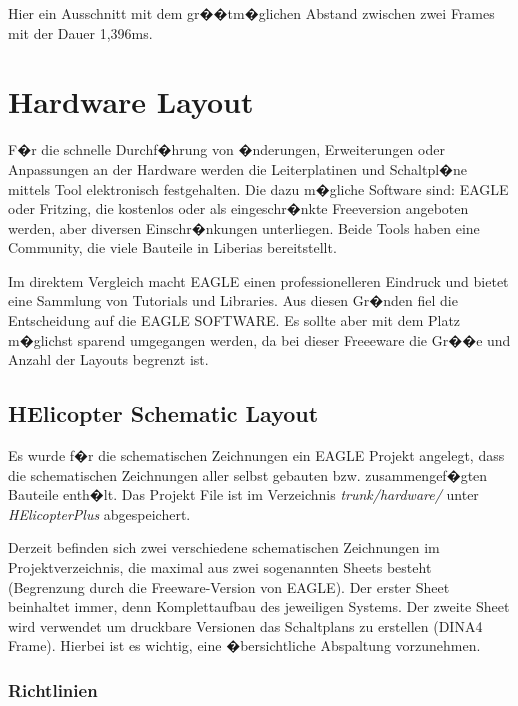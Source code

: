 Hier ein Ausschnitt mit dem gr��tm�glichen Abstand zwischen zwei Frames mit der Dauer 1,396ms.

\section{Hardware Layout}
F�r die schnelle Durchf�hrung von �nderungen, Erweiterungen oder Anpassungen an der Hardware werden die Leiterplatinen und Schaltpl�ne mittels Tool elektronisch festgehalten. Die dazu m�gliche Software sind: EAGLE oder Fritzing,
die kostenlos oder als eingeschr�nkte Freeversion angeboten werden, aber diversen Einschr�nkungen unterliegen. Beide Tools haben eine Community, die viele Bauteile in Liberias bereitstellt. 

Im direktem Vergleich macht EAGLE einen professionelleren Eindruck und bietet eine Sammlung von Tutorials und Libraries. Aus diesen Gr�nden fiel die Entscheidung auf die EAGLE SOFTWARE. Es sollte aber mit dem Platz m�glichst sparend umgegangen werden, da bei dieser Freeeware die Gr��e und Anzahl der Layouts begrenzt ist.

\subsection{HElicopter Schematic Layout}

Es wurde f�r die schematischen Zeichnungen ein EAGLE Projekt angelegt, dass die schematischen Zeichnungen aller selbst gebauten bzw. zusammengef�gten Bauteile enth�lt. Das Projekt File ist im Verzeichnis \textit{trunk/hardware/} unter \textit{HElicopterPlus} abgespeichert.

Derzeit befinden sich zwei verschiedene schematischen Zeichnungen im Projektverzeichnis, die maximal aus zwei sogenannten Sheets besteht (Begrenzung durch die Freeware-Version von EAGLE). Der erster Sheet beinhaltet immer, denn Komplettaufbau des jeweiligen Systems. Der zweite Sheet wird verwendet um druckbare Versionen das Schaltplans zu erstellen (DINA4 Frame). Hierbei ist es wichtig, eine �bersichtliche Abspaltung vorzunehmen. 


\newpage



\subsubsection{Richtlinien\cite{doc:guidelinesSchematics}}

